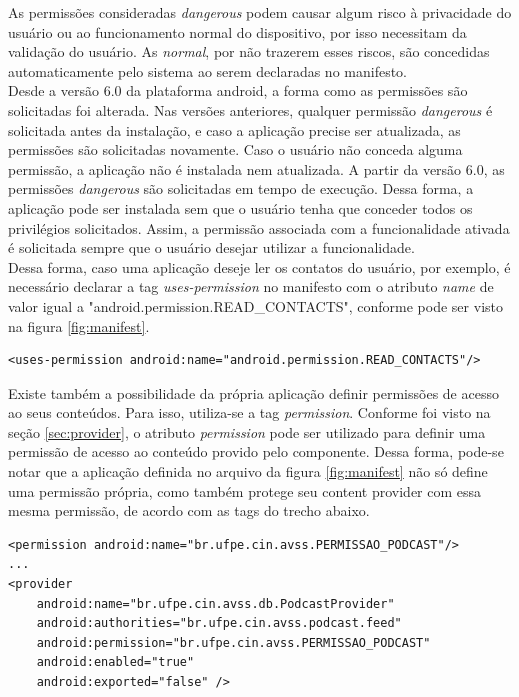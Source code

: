 \documentclass[a4paper,12pt]{article}
\begin{document}
As permissões consideradas \textit{dangerous} podem causar algum risco à privacidade do usuário ou ao funcionamento normal do dispositivo, por isso necessitam da validação do usuário. As \textit{normal}, por não trazerem esses riscos, são concedidas automaticamente pelo sistema ao serem declaradas no manifesto.\\

Desde a versão 6.0 da plataforma android, a forma como as permissões são solicitadas foi alterada. Nas versões anteriores, qualquer permissão \textit{dangerous} é solicitada antes da instalação, e caso a aplicação precise ser atualizada, as permissões são solicitadas novamente. Caso o usuário não conceda alguma permissão, a aplicação não é instalada nem atualizada. A partir da versão 6.0, as permissões \textit{dangerous} são solicitadas em tempo de execução. Dessa forma, a aplicação pode ser instalada sem que o usuário tenha que conceder todos os privilégios solicitados. Assim,  a permissão associada com a funcionalidade ativada é solicitada sempre que o usuário desejar utilizar a funcionalidade.\\

Dessa forma, caso uma aplicação deseje ler os contatos do usuário, por exemplo, é necessário declarar a tag \textit{uses-permission} no manifesto com o atributo \textit{name} de valor igual a "android.permission.READ\_CONTACTS", conforme pode ser visto na figura \ref{fig:manifest}.

{\fontsize{9pt}{12pt}
\begin{verbatim}
<uses-permission android:name="android.permission.READ_CONTACTS"/>
\end{verbatim}
}


Existe também a possibilidade da própria aplicação definir permissões de acesso ao seus conteúdos. Para isso, utiliza-se a tag \textit{permission}. Conforme foi visto na seção \ref{sec:provider}, o atributo \textit{permission} pode ser utilizado para definir uma permissão de acesso ao conteúdo provido pelo componente. Dessa forma, pode-se notar que a aplicação definida no arquivo da figura \ref{fig:manifest} não só define uma permissão própria, como também protege seu content provider com essa mesma permissão, de acordo com as tags do trecho abaixo.

{\fontsize{9pt}{12pt}
\begin{verbatim}
<permission android:name="br.ufpe.cin.avss.PERMISSAO_PODCAST"/>
...
<provider
    android:name="br.ufpe.cin.avss.db.PodcastProvider"
    android:authorities="br.ufpe.cin.avss.podcast.feed"
    android:permission="br.ufpe.cin.avss.PERMISSAO_PODCAST"
    android:enabled="true"
    android:exported="false" />
\end{verbatim}
}
\end{document}
